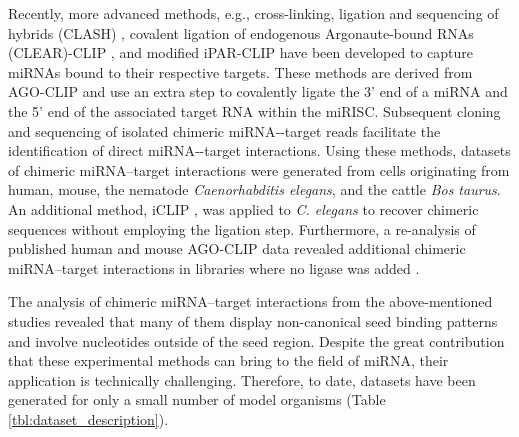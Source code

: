 \documentclass{bmcart}
\begin{document}
Recently, more advanced methods, e.g., cross-linking, ligation and sequencing of hybrids (CLASH) \cite{helwak2013mapping}, covalent ligation of endogenous Argonaute-bound RNAs (CLEAR)-CLIP \cite{darnell_moore2015mirna, scheel2017global}, and modified iPAR-CLIP \cite{grosswendt2014unambiguous} have been developed to capture miRNAs bound to their respective targets. These methods are derived from AGO-CLIP and use an extra step to covalently ligate the 3' end of a miRNA and the 5' end of the associated target RNA within the miRISC. Subsequent cloning and sequencing of isolated chimeric miRNA‐-target reads facilitate the identification of direct miRNA‐-target interactions. Using these methods, datasets of chimeric miRNA--target interactions were generated from cells originating from human, mouse, the nematode \textit{Caenorhabditis elegans}, and the cattle \textit{Bos taurus}.
An additional method, iCLIP \cite{broughton2016pairing}, was applied to \textit{C. elegans} to recover chimeric sequences without employing the ligation step. Furthermore, a re-analysis of published human and mouse AGO-CLIP data revealed additional chimeric miRNA--target interactions in libraries where no ligase was added \cite{grosswendt2014unambiguous}. 

The analysis of chimeric miRNA--target interactions from the above-mentioned studies revealed that many of them display non-canonical seed binding patterns and involve nucleotides outside of the seed region. Despite the great contribution that these experimental methods can bring to the field of miRNA, their application is technically challenging. Therefore, to date, datasets have been generated for only a small number of model organisms (Table \ref{tbl:dataset_description}).
\end{document}

